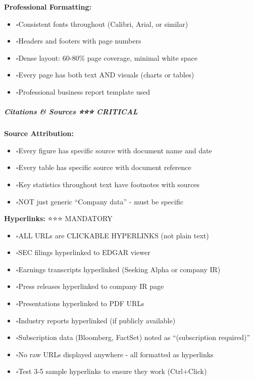 \documentclass[11pt]{article}
\newcommand{\UncheckedBox}{$\square$}
\begin{document}
\textbf{Professional Formatting:}

\begin{itemize}[leftmargin=*,itemsep=2pt,topsep=2pt]
\item {} \UncheckedBox Consistent fonts throughout (Calibri, Arial, or similar)
\item {} \UncheckedBox Headers and footers with page numbers
\item {} \UncheckedBox Dense layout: 60-80\% page coverage, minimal white space
\item {} \UncheckedBox Every page has both text AND visuals (charts or tables)
\item {} \UncheckedBox Professional business report template used
\end{itemize}

\subparagraph{Citations \& Sources ⭐⭐⭐ CRITICAL}\mbox{}\par

\textbf{Source Attribution:}

\begin{itemize}[leftmargin=*,itemsep=2pt,topsep=2pt]
\item {} \UncheckedBox Every figure has specific source with document name and date
\item {} \UncheckedBox Every table has specific source with document reference
\item {} \UncheckedBox Key statistics throughout text have footnotes with sources
\item {} \UncheckedBox NOT just generic ``Company data'' - must be specific
\end{itemize}

\textbf{Hyperlinks:} ⭐⭐⭐ MANDATORY

\begin{itemize}[leftmargin=*,itemsep=2pt,topsep=2pt]
\item {} \UncheckedBox ALL URLs are CLICKABLE HYPERLINKS (not plain text)
\item {} \UncheckedBox SEC filings hyperlinked to EDGAR viewer
\item {} \UncheckedBox Earnings transcripts hyperlinked (Seeking Alpha or company IR)
\item {} \UncheckedBox Press releases hyperlinked to company IR page
\item {} \UncheckedBox Presentations hyperlinked to PDF URLs
\item {} \UncheckedBox Industry reports hyperlinked (if publicly available)
\item {} \UncheckedBox Subscription data (Bloomberg, FactSet) noted as ``(subscription required)''
\item {} \UncheckedBox No raw URLs displayed anywhere - all formatted as hyperlinks
\item {} \UncheckedBox Test 3-5 sample hyperlinks to ensure they work (Ctrl+Click)
\end{itemize}
\end{document}
